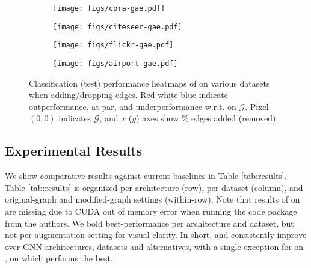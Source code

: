 \documentclass[letterpaper]{article} \usepackage{aaai21}  \usepackage{times}  \usepackage{helvet} \usepackage{courier}  \usepackage[hyphens]{url}  \usepackage{graphicx} \urlstyle{rm} \def\UrlFont{\rm}  \usepackage{natbib}  \usepackage{caption} \frenchspacing  \setlength{\pdfpagewidth}{8.5in}  \setlength{\pdfpageheight}{11in}
\begin{document}
\begin{figure}[t]
    \centering
        \begin{subfigure}[b]{.35\linewidth}
          \texttt{[image: figs/cora-gae.pdf]}
            \caption{\cora}\label{fig:}
        \end{subfigure}
        \quad
        \begin{subfigure}[b]{.35\linewidth}
          \texttt{[image: figs/citeseer-gae.pdf]}
            \caption{\citeseer}\label{fig:}
        \end{subfigure}
        \quad
        \begin{subfigure}[b]{.35\linewidth}
            \texttt{[image: figs/flickr-gae.pdf]}
            \caption{\flickr}\label{fig:}
        \end{subfigure}
        \quad
        \begin{subfigure}[b]{.35\linewidth}
            \texttt{[image: figs/airport-gae.pdf]}
            \caption{\airusa}\label{fig:}
        \end{subfigure}
    \caption{Classification (test) performance heatmaps of \methodtwo on various datasets when adding/dropping edges. Red-white-blue indicate outperformance, at-par, and underperformance w.r.t. \gcn on $\mathcal{G}$. Pixel $(0,0)$ indicates $\mathcal{G}$, and $x$ ($y$) axes show \% edges added (removed). }\label{fig:heat}
\end{figure}

\subsection{Experimental Results}

We show comparative results against current baselines in Table \ref{tab:results}.  Table \ref{tab:results} is organized per architecture (row), per dataset (column), and original-graph and modified-graph settings (within-row). Note that results of \bgcn on \ppi are missing due to CUDA out of memory error when running the code package from the authors. We bold best-performance per architecture and dataset, but not per augmentation setting for visual clarity.  In short, \method and \methodtwo consistently improve over GNN architectures, datasets and alternatives, with a single exception for \gat on \ppi, on which \dropedge performs the best.  
\end{document}
